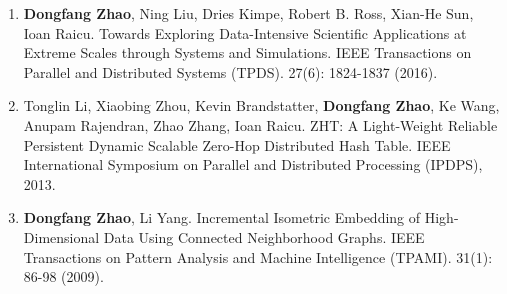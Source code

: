 \documentclass[11pt]{scrartcl}
\begin{document}
\begin{enumerate}
\item \textbf{Dongfang Zhao}, Ning Liu, Dries Kimpe, Robert B. Ross, Xian-He Sun, Ioan Raicu.
Towards Exploring Data-Intensive Scientific Applications at Extreme Scales through Systems and Simulations. IEEE Transactions on Parallel and Distributed Systems (TPDS). 27(6): 1824-1837 (2016).






\item Tonglin Li, Xiaobing Zhou, Kevin Brandstatter, \textbf{Dongfang Zhao}, Ke Wang, Anupam Rajendran, Zhao Zhang, Ioan Raicu.
ZHT: A Light-Weight Reliable Persistent Dynamic Scalable Zero-Hop Distributed Hash Table. 
IEEE International Symposium on Parallel and Distributed Processing (IPDPS), 2013.


\item \textbf{Dongfang Zhao}, Li Yang.
Incremental Isometric Embedding of High-Dimensional Data Using Connected Neighborhood Graphs. IEEE Transactions on Pattern Analysis and Machine Intelligence (TPAMI). 31(1): 86-98 (2009).


\end{enumerate}

% 
% 
\end{document}
